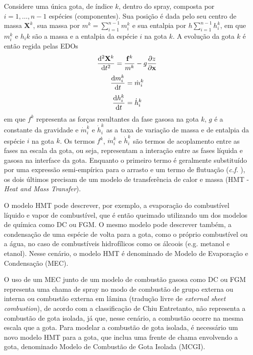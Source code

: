 Considere uma única gota, de índice $k$, dentro do spray, composta por $i=1,\ldots,n-1$ espécies (componentes).
Sua posição é dada pelo seu centro de massa $\mathbf X^k$, sua massa por $m^k = \sum_{i=1}^{n-1} m_{i}^k$ e sua entalpia por $h\sum_{i=1}^{n-1} h_{i}^k$, em que 
$m_i^k$ e $h_ik$ são a massa e a entalpia da espécie $i$ na gota $k$.
A evolução da gota $k$ é então regida pelas EDOs \cite{JennyB2012}
\begin{equation}
    \frac{\mathrm{d}^2 \mathbf X^k}{\mathrm{d} t^2} =
    \frac{\mathbf f^k}{ m^{k}} -
    g \frac{\partial z}{\partial \mathbf x}
    \label{eq:Xd}
\end{equation}
\begin{equation}
    \frac{\mathrm{d} m^{k}_i}{\mathrm{d} t} = \dot m^{k}_i
    \label{eq:md}
\end{equation}
\begin{equation}
    \frac{\mathrm{d} h^{k}_i}{\mathrm{d} t} = \dot h^{k}_i
    \label{eq:Td}
\end{equation}
em que $f^k$ representa as forças resultantes da fase gasosa na gota $k$, $g$ é a constante da gravidade e $\dot m^{k}_i$ e $\dot h^{k}_i$ as a taxa de variação de massa e de entalpia da espécie $i$ na gota $k$.
Os termos $f^k$, $\dot m^{k}_i$ e $\dot h^{k}_i$ são termos de acoplamento entre as fases na escala da gota, ou seja, representam a interação entre as fases líquida e gasosa na interface da gota.
Enquanto o primeiro termo é geralmente substituído por uma expressão semi-empírica para o arrasto e um termo de flutuação (\emph{c.f.} \cite[p. 16]{JennyB2012}), os dois últimos precisam de um modelo de transferência de calor e massa (HMT - \emph{Heat and Mass Transfer}).

O modelo HMT pode descrever, por exemplo, a evaporação do combustível líquido e vapor de combustível, que é então queimado utilizando um dos modelos de química como DC ou FGM.
O mesmo modelo pode descrever também, a condensação de uma espécie de volta para a gota, como o próprio combustível ou a água, no caso de combustíveis hidrofílicos como os álcoois (e.g. metanol e etanol).
Nesse cenário, o modelo HMT é denominado de Modelo de Evaporação e Condensação (MEC).

O uso de um MEC junto de um modelo de combustão gasosa como DC ou FGM representa uma chama de spray no modo de combustão de grupo externa ou interna ou combustão externa em lâmina (tradução livre de \emph{external sheet combustion}), de acordo com a classificação de Chiu 
Entretanto, não representa a combustão de gota isolada, já que, nesse cenário, a combustão ocorre na mesma escala que a gota.
Para modelar a combustão de gota isolada, é necessário um novo modelo HMT para a gota, que inclua uma frente de chama envolvendo a gota, denominado Modelo de Combustão de Gota Isolada (MCGI). 


